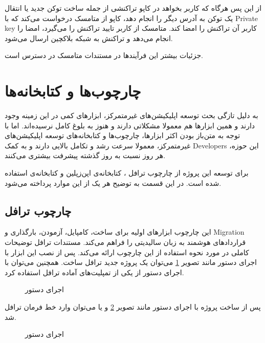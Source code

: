 از این پس هرگاه که کاربر بخواهد در کاپو تراکنشی از جمله
ساخت توکن جدید یا انتقال یک توکن به آدرس دیگر را انجام دهد،
کاپو از متامسک درخواست می‌کند که با
\gls{Private key}
کاربر آن تراکنش را امضا کند.
متامسک از کاربر تایید تراکنش را می‌گیرد، امضا را انجام می‌دهد و تراکنش به شبکه بلاکچین ارسال می‌شود.

جزئیات بیشتر این فرآیندها در مستندات متامسک
\cite{MetamaskDocs}
در دسترس است.

\section{چارچوب‌ها و کتابخانه‌ها}
به دلیل تازگی بحث توسعه اپلیکیشن‌های غیرمتمرکز،
ابزارهای کمی در این زمینه وجود دارند
و همین ابزارها هم معمولا مشکلاتی دارند و هنوز به بلوغ کامل نرسیده‌اند.
اما با توجه به متن‌باز بودن اکثر ابزارها، چارچوب‌ها و کتابخانه‌های توسعه اپلیکیشن‌های غیرمتمرکز،
معمولا سرعت رشد و تکامل بالایی دارند و به کمک
\glspl{Developer}
این حوزه، هر روز نسبت به روز گذشته پیشرفت بیشتری می‌کنند.

برای توسعه این پروژه از
چارچوب ترافل
،
کتابخانه‌ی اپن‌زپلین
و کتابخانه‌ی
استفاده شده است. در این قسمت به توضیح هر یک از این موارد پرداخته می‌شود.

\subsection{چارچوب ترافل}
این چارچوب ابزارهای اولیه برای ساخت، کامپایل، آزمودن، بارگذاری و
\gls{Migration}
قراردادهای هوشمند به زبان سالیدیتی را فراهم می‌کند.
مستندات ترافل
\cite{TruffleDocs}
توضیحات کاملی در مورد نحوه استفاده از این چارچوب ارائه می‌کند.
پس از نصب این ابزار با اجرای دستور
مانند تصویر 
\ref{fig:truffle-init}
می‌توان یک پروژه جدید ترافل ساخت.
همچنین می‌توان با اجرای دستور
از یکی از تمپلیت‌های آماده ترافل استفاده کرد.

\begin{figure}[H]
\centerline{}
\caption{اجرای دستور }
\label{fig:truffle-init}
\end{figure}

پس از ساخت پروژه با اجرای دستور
مانند تصویر
\ref{fig:truffle-develop}
و یا
 می‌توان وارد خط فرمان ترافل شد.

\begin{figure}[H]
\centerline{}
\caption{اجرای دستور }
\label{fig:truffle-develop}
\end{figure}

